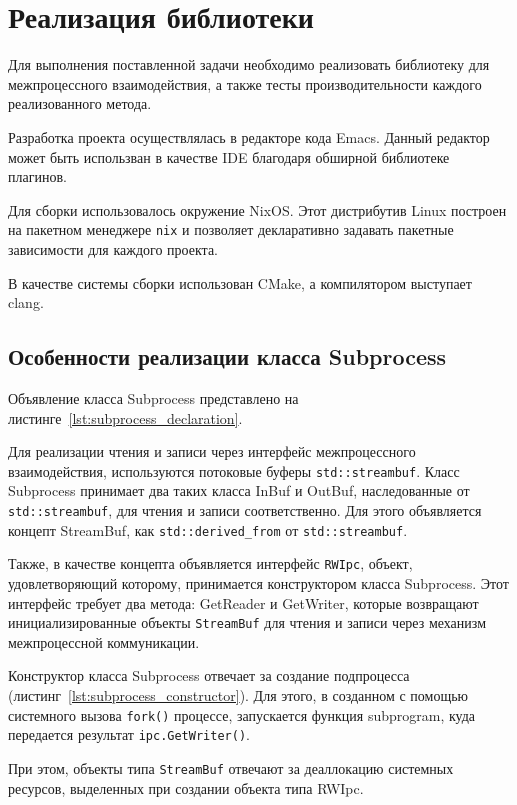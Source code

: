 \documentclass[14pt, russian]{scrartcl}
\newcommand{\refAlgo}[1]{(листинг~\ref{#1})}
\begin{document}
\section{Реализация библиотеки}

Для выполнения поставленной задачи необходимо реализовать библиотеку для
межпроцессного взаимодействия, а также тесты производительности каждого
реализованного метода.

Разработка проекта осуществлялась в редакторе кода Emacs\cite{DoomEmacs}. Данный
редактор может быть использван в качестве IDE благодаря обширной библиотеке
плагинов.

Для сборки использовалось окружение NixOS\cite{NixOS}. Этот дистрибутив Linux
построен на пакетном менеджере \verb|nix| и позволяет декларативно задавать
пакетные зависимости для каждого проекта.

В качестве системы сборки использован CMake\cite{CMake}, а компилятором
выступает clang.

\subsection{Особенности реализации класса Subprocess}

Объявление класса Subprocess представлено на
листинге~\ref{lst:subprocess_declaration}.

Для реализации чтения и записи через интерфейс межпроцессного взаимодействия,
используются потоковые буферы \verb|std::streambuf|. Класс Subprocess принимает
два таких класса InBuf и OutBuf, наследованные от \verb|std::streambuf|, для
чтения и записи соответственно. Для этого объявляется концепт StreamBuf, как
\verb|std::derived_from| от \verb|std::streambuf|.

Также, в качестве концепта объявляется интерфейс \verb|RWIpc|, объект,
удовлетворяющий которому, принимается конструктором класса Subprocess. Этот
интерфейс требует два метода: GetReader и GetWriter, которые возвращают
инициализированные объекты \verb|StreamBuf| для чтения и записи через механизм
межпроцессной коммуникации.

Конструктор класса Subprocess отвечает за создание подпроцесса
\refAlgo{lst:subprocess_constructor}. Для этого, в созданном с помощью
системного вызова \verb|fork()| процессе, запускается функция subprogram, куда
передается результат \verb|ipc.GetWriter()|.

При этом, объекты типа \verb|StreamBuf| отвечают за деаллокацию системных
ресурсов, выделенных при создании объекта типа RWIpc.
\end{document}
